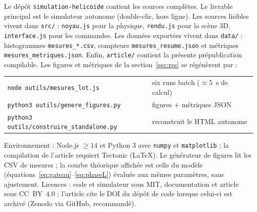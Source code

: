 Le dépôt \texttt{simulation-helicoide} contient les sources complètes. Le livrable
principal est le simulateur autonome \fichierstandalone
(double-clic, hors ligne). Les sources lisibles vivent dans \texttt{src/} :
\texttt{noyau.js} pour la physique, \texttt{rendu.js} pour la scène 3D,
\texttt{interface.js} pour les commandes. Les données exportées vivent dans
\texttt{data/} : histogrammes \texttt{mesures\_*.csv}, compteurs
\texttt{mesures\_resume.json} et métriques \texttt{mesures\_metriques.json}.
Enfin, \texttt{article/} contient la présente prépublication compilable. Les
figures et métriques de la section~\ref{sec:res} se régénèrent par :
\begin{center}\small
\begin{tabular}{@{}l@{\hspace{1.2em}}l@{}}
\texttt{node outils/mesures\_lot.js} & six runs batch ($\approx 5$~s de calcul) \\
\texttt{python3 outils/genere\_figures.py} & figures + métriques JSON \\
\texttt{python3 outils/construire\_standalone.py} & reconstruit le HTML autonome \\
\end{tabular}
\end{center}
Environnement : Node.js $\ge 14$ et Python 3 avec \texttt{numpy} et
\texttt{matplotlib} ; la compilation de l'article requiert Tectonic (LaTeX).
Le générateur de figures lit les CSV de mesures ; la courbe théorique affichée
est celle du modèle (équations~\eqref{eq:gateau}--\eqref{eq:phaseL}) évaluée aux
mêmes paramètres, sans ajustement. Licences : code et simulateur sous MIT,
documentation et article sous CC~BY~4.0 ; l'article cite le DOI du dépôt de
code lorsque celui-ci est archivé (Zenodo via GitHub, recommandé).

